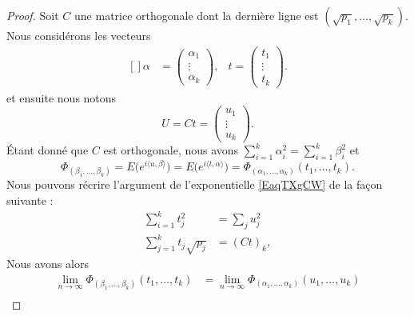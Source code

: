 \begin{proof}
    Soit \( C\) une matrice orthogonale dont la dernière ligne est \( (\sqrt{p_1},\ldots, \sqrt{p_k})\). Nous considérons les vecteurs
    \begin{equation}
        \begin{aligned}[]
            \alpha&=\begin{pmatrix}
                \alpha_1    \\ 
                \vdots    \\ 
                \alpha_k    
            \end{pmatrix},
            &t=\begin{pmatrix}
                t_1    \\ 
                \vdots    \\ 
                t_k    
            \end{pmatrix}.
        \end{aligned}
    \end{equation}
    et ensuite nous notons
    \begin{equation}
        U=Ct=\begin{pmatrix}
            u_1    \\ 
            \vdots    \\ 
            u_k    
        \end{pmatrix}.
    \end{equation}
    Étant donné que \( C\) est orthogonale, nous avons \( \sum_{i=1}^k\alpha_i^2=\sum_{i=1}^k\beta_i^2\) et
    \begin{equation}
        \Phi_{(\beta_1,\ldots, \beta_k)}=E\big(  e^{i\langle u, \beta\rangle } \big)=E\big(  e^{i\langle t, \alpha\rangle } \big)=\Phi_{(\alpha_1,\ldots, \alpha_k)}(t_1,\ldots, t_k).
    \end{equation}
    Nous pouvons récrire l'argument de l'exponentielle \eqref{EaqTXgCW} de la façon suivante :
    \begin{subequations}
        \begin{align}
            \sum_{i=1}^kt_j^2&=\sum_ju_j^2\\
            \sum_{j=1}^kt_j\sqrt{p_j}&=(Ct)_{k},
        \end{align}
    \end{subequations}
    Nous avons alors
    \begin{subequations}
        \begin{align}
            \lim_{n\to \infty} \Phi_{(\beta_1,\ldots, \beta_k)}(t_1,\ldots, t_k)&=\lim_{n\to \infty} \Phi_{(\alpha_1,\ldots, \alpha_k)}(u_1,\ldots, u_k)\\

\end{align}
\end{subequations}
\end{proof}
